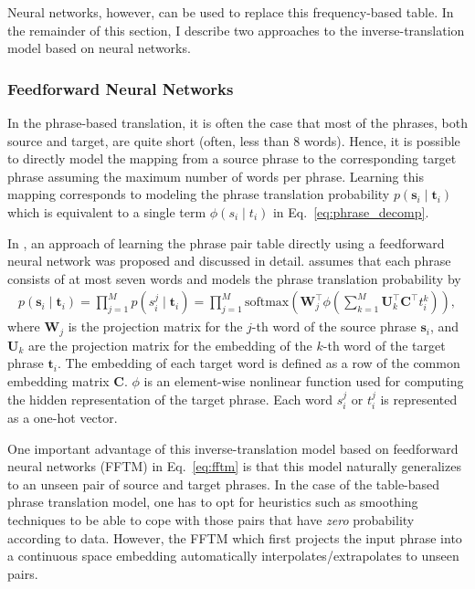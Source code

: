 \documentclass[11pt, oneside]{essay}
\newcommand{\softmax}{\text{softmax}}
\newcommand{\vect}[1]{\mathbf{#1}}
\newcommand{\matr}[1]{\mathbf{#1}}
\newcommand{\vs}[0]{\vect{s}}
\newcommand{\vt}[0]{\vect{t}}
\newcommand{\mW}[0]{\matr{W}}
\newcommand{\mU}[0]{\matr{U}}
\newcommand{\mC}{\matr{C}}
\begin{document}
Neural networks, however, can be used to replace this
frequency-based table. In the remainder of this section, I
describe two approaches to the inverse-translation model based on
neural networks.

\subsubsection{Feedforward Neural Networks}

In the phrase-based translation, it is often the case that most
of the phrases, both source and target, are quite short (often,
        less than $8$ words). Hence, it is possible to directly
model the mapping from a source phrase to the corresponding
target phrase assuming the maximum number of words per phrase.
Learning this mapping corresponds to modeling the phrase
translation probability $p(\vs_i \mid \vt_i)$ which is equivalent to
a single term $\phi(s_i \mid t_i)$ in
Eq.~\eqref{eq:phrase_decomp}.

In \citep{Schwenk2012,Son2012}, an approach of learning the phrase
pair table directly using a feedforward neural network was
proposed and discussed in detail. \citet{Schwenk2012} assumes that
each phrase consists of at most seven words and models the phrase
translation probability by
\begin{align}
\label{eq:fftm}
p(\vs_i \mid \vt_i) = \prod_{j=1}^M p(s_i^j \mid \vt_i) 
                     = \prod_{j=1}^M \softmax\left( \mW_j^\top
                             \phi \left( \sum_{k=1}^M \mU_k^\top
                                 \mC^\top t_i^k  \right) \right),
\end{align}
where $\mW_j$ is the projection matrix for the $j$-th word of the
source phrase $\vs_i$, and $\mU_k$ are the projection
matrix for the embedding of the $k$-th word of the target phrase
$\vt_i$. The embedding of each target word is defined as a row of
the common embedding matrix $\mC$. $\phi$ is an element-wise
nonlinear function used for computing the hidden representation
of the target phrase. Each word $s_i^j$ or $t_i^j$ is represented
as a one-hot vector.

One important advantage of this inverse-translation model based
on feedforward neural networks (FFTM) in Eq.~\eqref{eq:fftm} is
that this model naturally generalizes to an unseen pair of source
and target phrases. In the case of the table-based phrase
translation model, one has to opt for heuristics such as
smoothing techniques to be able to cope with those pairs that
have \textit{zero} probability according to data. However, the
FFTM which first projects the input phrase into a continuous
space embedding automatically interpolates/extrapolates to unseen
pairs.
\end{document}
